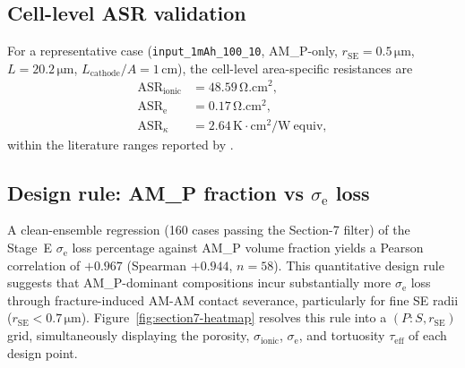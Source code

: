\documentclass[11pt, a4paper]{article}
\newcommand{\sigmaionic}{\ensuremath{\sigma_{\mathrm{ionic}}}}
\newcommand{\sigmae}{\ensuremath{\sigma_{\mathrm{e}}}}
\newcommand{\AMP}{AM\_P}
\begin{document}
\subsection{Cell-level ASR validation}
For a representative case (\texttt{input\_1mAh\_100\_10},
\AMP-only, $r_{\mathrm{SE}} = 0.5\,\si{\micro\metre}$, $L = 20.2\,\si{\micro\metre}$,
$L_{\mathrm{cathode}}/A = 1$\,cm),
the cell-level area-specific resistances are
\begin{align}
\mathrm{ASR}_{\mathrm{ionic}} &= 48.59 \,\si{\ohm.\centi\metre^2}, \\
\mathrm{ASR}_{\mathrm{e}}     &= 0.17  \,\si{\ohm.\centi\metre^2}, \\
\mathrm{ASR}_{\kappa}         &= 2.64  \,\mathrm{K\cdot cm^2 / W\ equiv},
\end{align}
within the literature ranges reported by
\citet{Bielefeld2022, Minnmann2021, Lee2020}.

\subsection{Design rule: AM\_P fraction vs $\sigmae$ loss}
\label{sec:design-rule}
A clean-ensemble regression (160 cases passing the Section-7
filter) of the Stage~E $\sigmae$ loss percentage against AM\_P
volume fraction yields a Pearson correlation of $+0.967$
(Spearman $+0.944$, $n = 58$). This quantitative design rule
suggests that AM\_P-dominant compositions incur substantially more
$\sigmae$ loss through fracture-induced AM-AM contact severance,
particularly for fine SE radii ($r_{\mathrm{SE}} < 0.7\,\si{\micro\metre}$).
Figure~\ref{fig:section7-heatmap} resolves this rule into a
$(P\!:\!S, r_{\mathrm{SE}})$ grid, simultaneously displaying the
porosity, $\sigmaionic$, $\sigmae$, and tortuosity $\tau_{\mathrm{eff}}$
of each design point.
\end{document}
